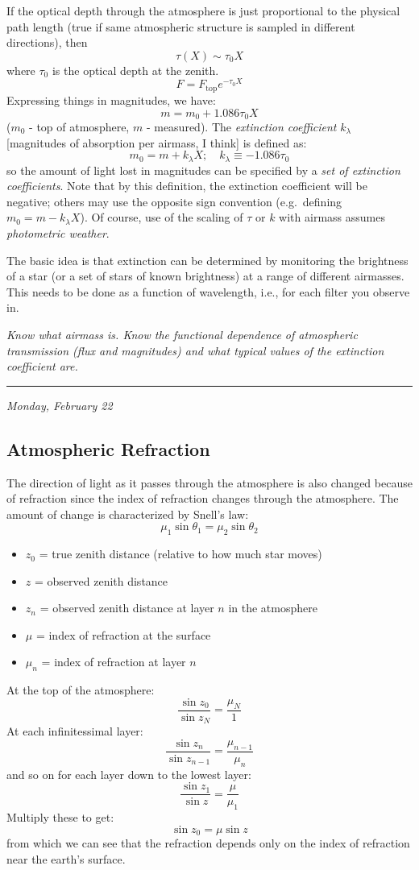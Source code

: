 \documentclass[12pt]{article}
\newcommand{\test}[1]{%
    \begin{center}
        {\parbox{0.9\textwidth}{\textit{\small#1}}}
    \end{center}}
\newcommand{\mydate}[1]{
    \begin{flushright}
        \rule{\textwidth}{0.4pt} %
        \small\hfill\textit{#1}
    \end{flushright}}
\begin{document}
If the optical depth through the atmosphere is just proportional to the
physical path length (true if same atmospheric structure is sampled in
different directions), then
\[
    \tau(X) \sim \tau_{0}X
    \]
where $\tau_{0}$ is the optical depth at the zenith.
\[
     F = F_{\textrm{top}}e^{-\tau_{0}X}
    \]
Expressing things in magnitudes, we have:
\[
     m = m_{0} + 1.086\tau_{0}X
    \]
($m_{0}$ - top of atmosphere, $m$ - measured).
The \textit{extinction coefficient} $k_{\lambda}$ [magnitudes of
absorption per airmass, I think] is defined as:
\[
     m_{0} = m + k_{\lambda}X ;\quad
     k_{\lambda} \equiv -1.086\tau_{0}
    \]
so the amount of light lost in magnitudes can be specified by a \emph{set of
extinction coefficients}. Note that by this definition, the extinction
coefficient will be negative; others may use the opposite sign convention
(e.g.\ defining $m_{0} = m - k_{\lambda}X$). Of course, use of the scaling of
$\tau$ or $k$ with airmass assumes \textit{photometric weather}.

The basic idea is that extinction can be determined by monitoring the
brightness of a star (or a set of stars of known brightness) at a range of
different airmasses. This needs to be done as a function of wavelength, i.e.,
for each filter you observe in.

\test{Know what airmass is. Know the functional dependence of atmospheric
transmission (flux and magnitudes) and what typical values of the extinction
coefficient are.}

\mydate{Monday, February 22}
\subsection{Atmospheric Refraction}
The direction of light as it passes through the atmosphere is also changed
because of refraction since the index of refraction changes through the
atmosphere. The amount of change is characterized by Snell's law:
\[
     \mu_{1}\sin\theta_{1} = \mu_{2}\sin\theta_{2}
     \]
\begin{itemize}
    \item $z_{0}$ = true zenith distance (relative to how much star moves)
    \item $z$ = observed zenith distance
    \item $z_{n}$ = observed zenith distance at layer $n$ in the
        atmosphere
    \item $\mu$ = index of refraction at the surface
    \item $\mu_{n}$ = index of refraction at layer $n$
\end{itemize}
At the top of the atmosphere:
\[
     \frac{\sin z_{0}}{\sin z_{N}} = \frac{\mu_{N}}{1}
     \]
At each infinitessimal layer:
\[
     \frac{\sin z_{n}}{\sin z_{n-1}} = \frac{\mu_{n-1}}{\mu_{n}}
     \]
and so on for each layer down to the lowest layer:
\[
     \frac{\sin z_{1}}{\sin z} = \frac{\mu}{\mu_{1}}
     \]
Multiply these to get:
\[
     \sin z_{0} = \mu\sin z
     \]
from which we can see that the refraction depends
only on the index of refraction near the earth's surface.
\end{document}
